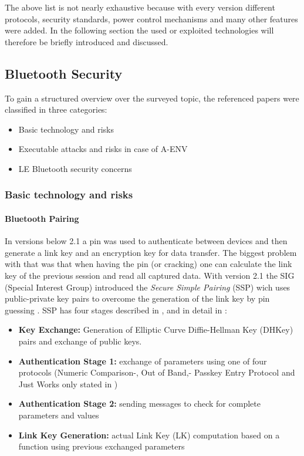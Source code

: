 \documentclass[12pt,a4paper]{article}
\begin{document}
The above list is not nearly exhaustive because with every version different protocols, security standards, power control mechanisms and many other features were added. In the following section the used or exploited technologies will therefore be briefly introduced and discussed.

\subsection{Bluetooth Security}
To gain a structured overview over the surveyed topic, the referenced papers were classified in three categories: 
\begin{itemize}
	\item Basic technology and risks
	\item Executable attacks and risks in case of A-ENV
	\item LE Bluetooth security concerns
\end{itemize}


\subsubsection{Basic technology and risks}

\paragraph{Bluetooth Pairing}
In versions below 2.1 a pin was used to authenticate between devices and then generate a link key and an encryption key for data transfer. The biggest problem with that was that when having the pin (or cracking) one can calculate the link key of the previous session and read all captured data. With version 2.1 the SIG (Special Interest Group) introduced the \emph{Secure Simple Pairing} (SSP) wich uses public-private key pairs to overcome the generation of the link key by pin guessing \cite{DBLP:conf/apnoms/FanSL11}. SSP has four stages described in \cite{DBLP:conf/apnoms/FanSL11},  \cite{DBLP:journals/ijnsec/YehPWH12} and in detail in \cite{DBLP:journals/ijnsec/Lackner13} :

\begin{itemize}
	\item \textbf{Key Exchange:} Generation of Elliptic Curve Diffie-Hellman Key (DHKey) pairs and exchange of public keys.
	\item \textbf{Authentication Stage 1:} exchange of parameters using one of four protocols (Numeric Comparison-, Out of Band,- Passkey Entry Protocol and Just Works only stated in \cite{DBLP:journals/ijnsec/Lackner13})
	\item \textbf{Authentication Stage 2:} sending messages to check for complete parameters and values
	\item \textbf{Link Key Generation:} actual Link Key (LK) computation based on a function using previous exchanged parameters
\end{itemize}
\end{document}
